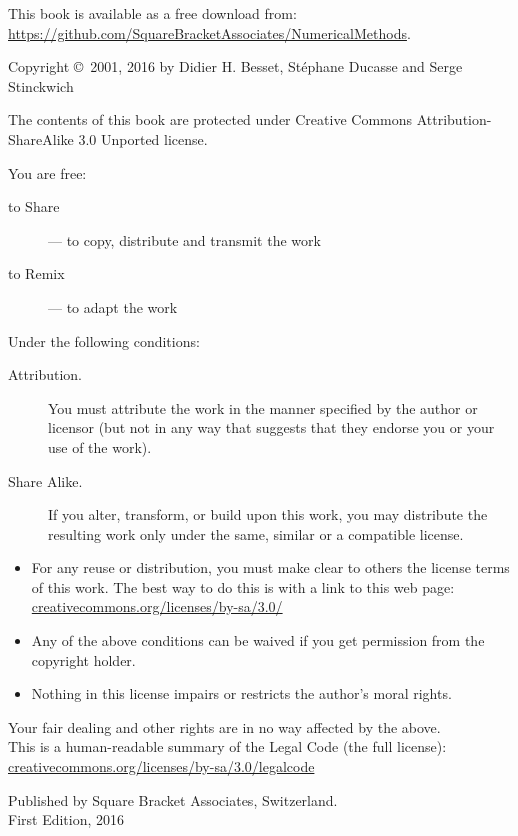 \begin{footnotesize}
\vspace*{\fill}
\setlength{\parindent}{0pt}
This book is available as a free download from:\\ \url{https://github.com/SquareBracketAssociates/NumericalMethods}.
\bigskip

Copyright \copyright~2001, 2016 by Didier H. Besset, St\'ephane Ducasse and Serge Stinckwich
\bigskip

The contents of this book are protected under Creative Commons Attribution-ShareAlike 3.0 Unported license.
\medskip

You are free:
\begin{description}
  \item[to Share] --- to copy, distribute and transmit the work
  \item[to Remix] --- to adapt the work
\end{description}
\medskip

Under the following conditions:
\begin{description}
  \item[Attribution.] You must attribute the work in the manner specified by the author or licensor (but not in any way that suggests that they endorse you or your use of the work).
  \item[Share Alike.] If you alter, transform, or build upon this work, you may distribute the resulting work only under the same, similar or a compatible license.
\end{description}
\begin{itemize}
  \item For any reuse or distribution, you must make clear to others the license terms of this work. The best way to do this is with a link to this web page:
  \url{creativecommons.org/licenses/by-sa/3.0/}
  \item Any of the above conditions can be waived if you get permission from the copyright holder.
  \item Nothing in this license impairs or restricts the author's moral rights.
\end{itemize}
\quad
\parbox{\textwidth}{
	Your fair dealing and other rights are in no way affected by the above.\\
	This is a human-readable summary of the Legal Code (the full license):\\
	\url{creativecommons.org/licenses/by-sa/3.0/legalcode}}
\bigskip

Published by Square Bracket Associates, Switzerland.\\
First Edition, 2016
\vspace*{\fill}
\end{footnotesize}

